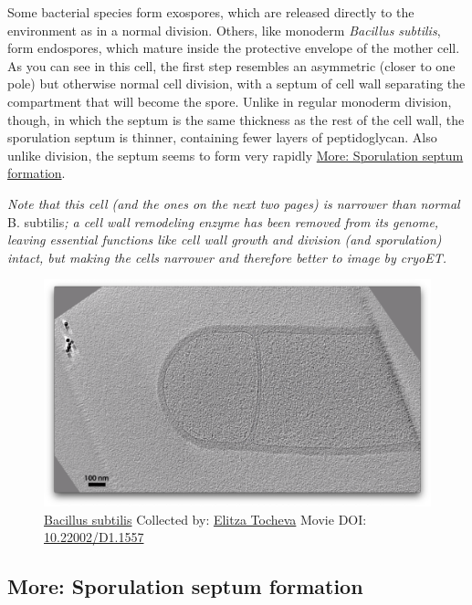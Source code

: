 \documentclass[]{tufte-book}
\begin{document}
Some bacterial species form exospores, which are released directly to
the environment as in a normal division. Others, like monoderm
\emph{Bacillus subtilis}, form endospores, which mature inside the
protective envelope of the mother cell. As you can see in this cell, the
first step resembles an asymmetric (closer to one pole) but otherwise
normal cell division, with a septum of cell wall separating the
compartment that will become the spore. Unlike in regular monoderm
division, though, in which the septum is the same thickness as the rest
of the cell wall, the sporulation septum is thinner, containing fewer
layers of peptidoglycan. Also unlike division, the septum seems to form
very rapidly \protect\hyperlink{Sporulation_septum_formation}{More:
Sporulation septum formation}.

\emph{Note that this cell (and the ones on the next two pages) is
narrower than normal }B. subtilis\emph{; a cell wall remodeling enzyme
has been removed from its genome, leaving essential functions like cell
wall growth and division (and sporulation) intact, but making the cells
narrower and therefore better to image by cryoET.}





\begin{figure}
\includegraphics{movie_stills/8_5} \caption[\protect\hyperlink{tree}{Bacillus subtilis} Collected by:
\protect\hyperlink{elitza_tocheva}{Elitza Tocheva} Movie DOI:
\href{https://doi.org/10.22002/D1.1557}{10.22002/D1.1557}]{\protect\hyperlink{tree}{Bacillus subtilis} Collected by:
\protect\hyperlink{elitza_tocheva}{Elitza Tocheva} Movie DOI:
\href{https://doi.org/10.22002/D1.1557}{10.22002/D1.1557}}\label{fig:8-5}
\end{figure}

\hypertarget{Sporulation_septum_formation}{\subsection*{More:
Sporulation septum formation}\label{Sporulation_septum_formation}}
\end{document}

